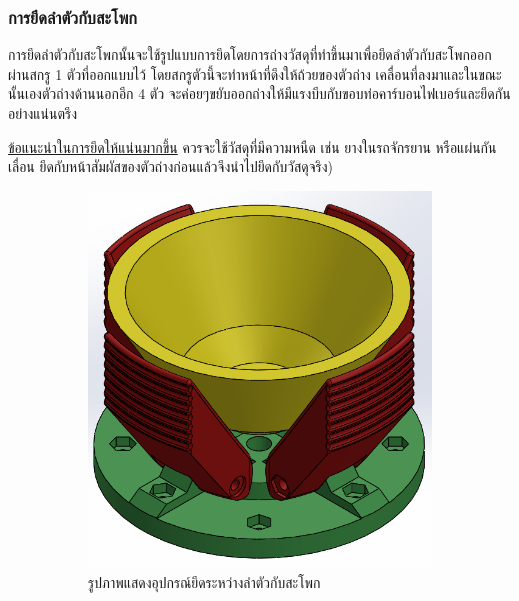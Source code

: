 \subsubsection*{การยึดลำตัวกับสะโพก}
การยึดลำตัวกับสะโพกนั้นจะใช้รูปแบบการยึดโดยการถ่างวัสดุที่ทำขึ้นมาเพื่อยึดลำตัวกับสะโพกออกผ่านสกรู 1 ตัวที่ออกแบบไว้ โดยสกรูตัวนี้จะทำหน้าที่ดึงให้ถ้วยของตัวถ่าง
เคลื่อนที่ลงมาและในขณะนั้นเองตัวถ่างด้านนอกอีก 4 ตัว จะค่อยๆขยับออกถ่างให้มีแรงบีบกับขอบท่อคาร์บอนไฟเบอร์และยึดกันอย่างแน่นตรึง

\underline{ข้อแนะนำในการยึดให้แน่นมากขึ้น}
ควรจะใช้วัสดุที่มีความหนืด เช่น ยางในรถจักรยาน หรือแผ่นกันเลื่อน ยึดกับหน้าสัมผัสของตัวถ่างก่อนแล้วจึงนำไปยึดกับวัสดุจริง)


\begin{figure}[h!]
  \centering
  \begin{subfigure}[b]{0.4\linewidth}
    \includegraphics[width=\linewidth]{chapter4/images/hipconnector.PNG}
    \caption{รูปภาพแสดงอุปกรณ์ยึดระหว่างลำตัวกับสะโพก}
  \end{subfigure}
  \begin{subfigure}[b]{0.4\linewidth}

\end{subfigure}
\end{figure}
